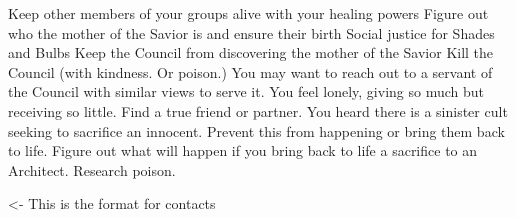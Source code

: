 \documentclass[char]{Silversiders}
\begin{document}
\name{\cCaregiver{}}

Keep other members of your groups alive with your healing powers
Figure out who the mother of the Savior is and ensure their birth
Social justice for Shades and Bulbs
Keep the Council from discovering the mother of the Savior
Kill the Council (with kindness. Or poison.) You may want to reach out to a servant of the Council with similar views to serve it.
You feel lonely, giving so much but receiving so little. Find a true friend or partner.
You heard there is a sinister cult seeking to sacrifice an innocent. Prevent this from happening or bring them back to life.
Figure out what will happen if you bring back to life a sacrifice to an Architect.
Research poison.

\begin{itemz}[Goals]
	\item 
\end{itemz}

\begin{itemz}[Notes]
	\item 
\end{itemz}

\begin{contacts}
	\contact{\cTest{}} <- This is the format for contacts 
\end{contacts}
\end{document}
